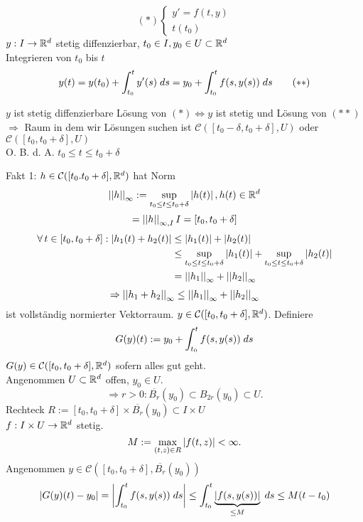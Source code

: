 \documentclass[../ana2.tex]{subfiles}
\begin{document}
\[ (*) \begin{cases}
    y' = f(t,y) \\
    t(t_0)
\end{cases} \]
\( \abb{y}{I}{\R^d} \) stetig diffenzierbar, 
\( t_0 \in I, y_0 \in U \subset \R^d \)\\
Integrieren von \( t_0 \) bis \(t\)
\[ y(t) = y(t_0) + \integralx{y'(s)}{t_0}{t}{s} 
= y_0 + \integralx{f(s, y(s))}{t_0}{t}{s} \tag{\(**\)} \]
\begin{lem}
    \(y\) ist stetig diffenzierbare Lösung von \((*) \Leftrightarrow y\)
    ist stetig und Lösung von \((**)\)\\
    \(\Rightarrow \) Raum in dem wir Lösungen suchen ist 
    \(\mathcal{C}([t_0-\delta, t_0+\delta], U)\)
    oder \(\mathcal{C}([t_0, t_0+\delta], U)\)\\
    O. B. d. A. \(t_0 \leq t \leq t_0 + \delta\)
\end{lem}
Fakt 1: \( h \in \mathcal{C}([t_0. t_0 + \delta], \R^d) \) 
hat Norm 
\[\norm{h}_\infty := \underset{t_0 \leq t \leq t_0 + \delta}{\sup} \abs{h(t)}, h(t) \in \R^d \]
\[ = \norm{h}_{\infty, I} I = [t_0, t_0 + \delta] \]
\begin{align*}
    \forall t \in [t_0, t_0 + \delta] : \abs{h_1(t) + h_2(t)} &\leq \abs{h_1(t)} + \abs{h_2(t)}\\
    &\leq \underset{t_0 \leq t \leq t_0 + \delta}{\sup} \abs{h_1(t)} 
    + \underset{t_0 \leq t \leq t_0 + \delta}{\sup} \abs{h_2(t)}\\
    &= \norm{h_1}_\infty + \norm{h_2}_\infty
\end{align*}
\[ \Rightarrow \norm{h_1 + h_2}_\infty \leq \norm{h_1}_\infty + \norm{h_2}_\infty \]
ist vollständig normierter Vektorraum.
\( y \in \mathcal{C}([t_0, t_0 + \delta], \R^d) \). Definiere 
\[ G(y)(t) := y_0 + \integralx{f(s, y(s))}{t_0}{t}{s} \]
\( G(y) \in \mathcal{C}([t_0, t_0 + \delta], \R^d) \) sofern alles gut geht.\\
Angenommen \(U \subset \R^d\) offen, \( y_0 \in U \).
\[ \Rightarrow r>0: \overline{B_r}(y_0) \subset B_{2r}(y_0) \subset U. \]
Rechteck \(R := [t_0, t_0+\delta] \times \overline{B_r}(y_0) \subset I \times U\)\\
\(\abb{f}{I\times U}{\R^d}\) stetig. 
\[ M := \underset{(t,z) \in R}{\max} \abs{f(t,z)} < \infty. \]
Angenommen \( y \in \mathcal{C}([t_0, t_0 + \delta], \overline{B_r}(y_0)) \)
\[ \abs{G(y)(t) - y_0} = \abs{\integralx{f(s, y(s))}{t_0}{t}{s}} 
\leq \integralx{\underbrace{\abs{f(s, y(s))}}_{\leq M}}{t_0}{t}{s} \leq M(t - t_0) \]
\end{document}
